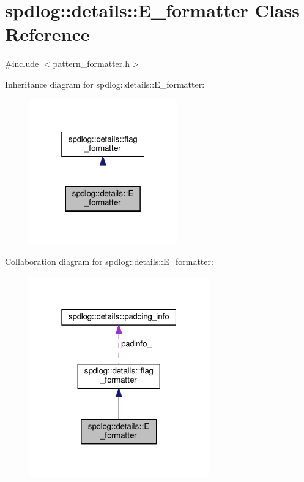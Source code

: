 \hypertarget{classspdlog_1_1details_1_1_e__formatter}{}\section{spdlog\+:\+:details\+:\+:E\+\_\+formatter Class Reference}
\label{classspdlog_1_1details_1_1_e__formatter}


{\ttfamily \#include $<$pattern\+\_\+formatter.\+h$>$}



Inheritance diagram for spdlog\+:\+:details\+:\+:E\+\_\+formatter\+:
\nopagebreak
\begin{figure}[H]
\begin{center}
\leavevmode
\includegraphics[width=181pt]{classspdlog_1_1details_1_1_e__formatter__inherit__graph}
\end{center}
\end{figure}


Collaboration diagram for spdlog\+:\+:details\+:\+:E\+\_\+formatter\+:
\nopagebreak
\begin{figure}[H]
\begin{center}
\leavevmode
\includegraphics[width=220pt]{classspdlog_1_1details_1_1_e__formatter__coll__graph}
\end{center}
\end{figure}
